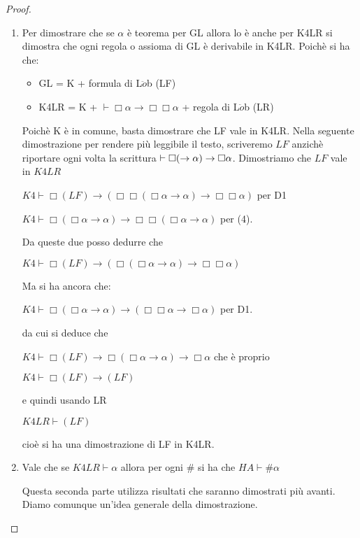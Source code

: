 \begin{proof} ~
\begin{enumerate}
\item 
Per dimostrare che se $\alpha$ \`e teorema per GL allora lo \`e anche per K4LR
si dimostra che ogni regola o assioma di GL \`e derivabile in K4LR.
Poich\`e si ha che:
\begin{itemize}
\item GL = K + formula di L$\ddot{o}$b (LF)
\item K4LR = K + $\vdash\Box\alpha \rightarrow \Box\Box\alpha$ + regola di L$\ddot{o}$b (LR)\\
\end{itemize}

Poich\`e K \`e in comune, basta dimostrare che LF vale  in K4LR.
Nella seguente dimostrazione per rendere pi\`u leggibile il testo, scriveremo $LF$ anzich\`e riportare ogni volta 
la scrittura $\vdash \Box(\box\alpha\rightarrow\alpha)\rightarrow\Box\alpha$.
Dimostriamo che $LF$ vale in $K4LR$

$K4 \vdash  \Box(LF) \rightarrow (\Box\Box(\Box\alpha\rightarrow\alpha)\rightarrow\Box\Box\alpha)$ per D1

$K4 \vdash \Box(\Box\alpha\rightarrow\alpha)\rightarrow\Box\Box(\Box\alpha\rightarrow\alpha)$ per (4).

Da queste due posso dedurre che

$K4 \vdash \Box(LF) \rightarrow ( \Box(\Box\alpha\rightarrow\alpha) \rightarrow \Box\Box\alpha) $

Ma si ha ancora che:

$K4 \vdash \Box(\Box\alpha\rightarrow\alpha)\rightarrow (\Box\Box\alpha \rightarrow \Box\alpha)$ per D1.

da cui  si deduce che

$K4 \vdash \Box(LF) \rightarrow \Box(\Box\alpha\rightarrow\alpha) \rightarrow \Box\alpha$ 
che \`e proprio

$K4 \vdash \Box(LF) \rightarrow (LF)$

e quindi usando LR

$K4LR \vdash (LF)$

cio\`e si ha una dimostrazione di LF in K4LR.\\

\item Vale che se $K4LR \vdash \alpha$ allora per ogni $\#$ si ha che 
$HA \vdash \#\alpha$

Questa seconda parte utilizza risultati che saranno dimostrati pi\`u avanti.
Diamo comunque un'idea generale della dimostrazione.\\


\end{enumerate}
\end{proof}
